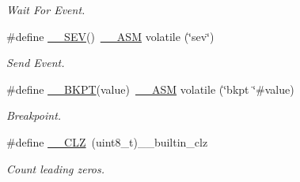 \begin{DoxyCompactItemize}
\begin{DoxyCompactList}\small\item\em Wait For Event. \end{DoxyCompactList}\item 
\#define \mbox{\hyperlink{group___c_m_s_i_s___core___instruction_interface_gafa58e60fcd2176ad58f96947466ea1fa}{\+\_\+\+\_\+\+S\+EV}}()~\mbox{\hyperlink{cmsis__iccarm_8h_a1378040bcf22428955c6e3ce9c2053cd}{\+\_\+\+\_\+\+A\+SM}} volatile (\char`\"{}sev\char`\"{})
\begin{DoxyCompactList}\small\item\em Send Event. \end{DoxyCompactList}\item 
\#define \mbox{\hyperlink{group___c_m_s_i_s___core___instruction_interface_ga15ea6bd3c507d3e81c3b3a1258e46397}{\+\_\+\+\_\+\+B\+K\+PT}}(value)~\mbox{\hyperlink{cmsis__iccarm_8h_a1378040bcf22428955c6e3ce9c2053cd}{\+\_\+\+\_\+\+A\+SM}} volatile (\char`\"{}bkpt \char`\"{}\#value)
\begin{DoxyCompactList}\small\item\em Breakpoint. \end{DoxyCompactList}\item 
\#define \mbox{\hyperlink{group___c_m_s_i_s___core___instruction_interface_ga5d5bb1527e042be4a9fa5a33f65cc248}{\+\_\+\+\_\+\+C\+LZ}}~(uint8\+\_\+t)\+\_\+\+\_\+builtin\+\_\+clz
\begin{DoxyCompactList}\small\item\em Count leading zeros. \end{DoxyCompactList}\end{DoxyCompactItemize}

